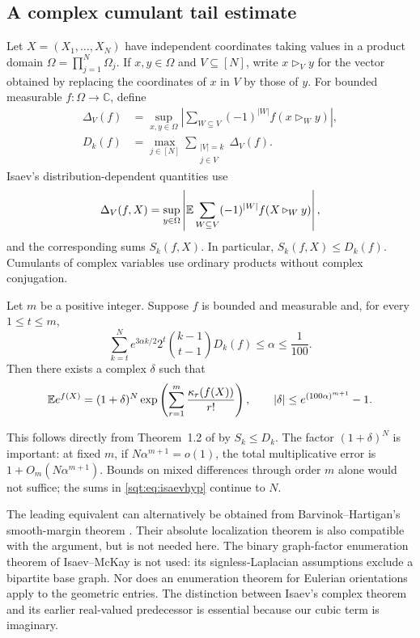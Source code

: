 \subsection{A complex cumulant tail estimate}
Let $X=(X_1,\ldots,X_N)$ have independent coordinates taking values in a product domain $\Omega=\prod_{j=1}^N\Omega_j$. If $x,y\in\Omega$ and $V\subseteq[N]$, write $x\mathbin{\triangleright_V}y$ for the vector obtained by replacing the coordinates of $x$ in $V$ by those of $y$. For bounded measurable $f:\Omega\to\mathbb C$, define
\begin{align}
\Delta_V(f)&=\sup_{x,y\in\Omega}\left|
 \sum_{W\subseteq V}(-1)^{|W|}f(x\mathbin{\triangleright_W}y)\right|,\\
D_k(f)&=\max_{j\in[N]}\sum_{\substack{|V|=k\\j\in V}}\Delta_V(f).
\end{align}
Isaev's distribution-dependent quantities use
\[
\Delta_V(f,X)=\sup_{y\in\Omega}\left|\mathbb E\sum_{W\subseteq V}
 (-1)^{|W|}f(X\mathbin{\triangleright_W}y)\right|,
\]
and the corresponding sums $S_k(f,X)$. In particular, $S_k(f,X)\leq D_k(f)$. Cumulants of complex variables use ordinary products without complex conjugation.

\begin{proposition}\label{sqt:prop:complex}
Let $m$ be a positive integer. Suppose $f$ is bounded and measurable and, for every $1\leq t\leq m$,
\begin{equation}\label{sqt:eq:isaevhyp}
\sum_{k=t}^N e^{3\alpha k/2}2^t\binom{k-1}{t-1}D_k(f)
 \leq\alpha\leq\frac1{100}.
\end{equation}
Then there exists a complex $\delta$ such that
\begin{equation}\label{sqt:eq:isaev}
\mathbb E e^{f(X)}=(1+\delta)^N
 \exp\left(\sum_{r=1}^m\frac{\kappa_r(f(X))}{r!}\right),
\qquad |\delta|\leq e^{(100\alpha)^{m+1}}-1.
\end{equation}
\end{proposition}
This follows directly from Theorem~1.2 of \cite{Isaev} by $S_k\leq D_k$. The factor $(1+\delta)^N$ is important: at fixed $m$, if $N\alpha^{m+1}=o(1)$, the total multiplicative error is $1+O_m(N\alpha^{m+1})$. Bounds on mixed differences through order $m$ alone would not suffice; the sums in \eqref{sqt:eq:isaevhyp} continue to $N$.

The leading equivalent can alternatively be obtained from Barvinok--Hartigan's smooth-margin theorem \cite[Theorem~1.3]{BH}. Their absolute localization theorem is also compatible with the argument, but is not needed here. The binary graph-factor enumeration theorem of Isaev--McKay \cite{IM} is not used: its signless-Laplacian assumptions exclude a bipartite base graph. Nor does an enumeration theorem for Eulerian orientations \cite{IMZ} apply to the geometric entries. The distinction between Isaev's complex theorem and its earlier real-valued predecessor is essential because our cubic term is imaginary.

